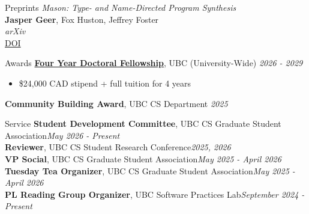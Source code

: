\documentclass{resume} %
\begin{document}
\begin{rSection}{Preprints} 
  {\em Mason: Type- and Name-Directed Program Synthesis}
  \\\textbf{Jasper Geer}, Fox Huston, Jeffrey Foster
  \\ {\it arXiv}
  \\ \href{https://doi.org/10.48550/arXiv.2602.16981}{DOI}
\end{rSection}

\begin{rSection}{Awards} 
{\bf \href{https://www.grad.ubc.ca/awards/four-year-doctoral-fellowship-4yf}{Four Year Doctoral Fellowship}}{, UBC (University-Wide)} \hfill{\em 2026 - 2029}
\begin{itemize}
  \item \$24,000 CAD stipend + full tuition for 4 years
\end{itemize}

{\bf Community Building Award}{, UBC CS Department} \hfill{\em 2025}


\end{rSection}

\begin{rSection}{Service} 
{\bf Student Development Committee}{, UBC CS Graduate Student Association}\hfill{\em May 2026 - Present}\\
{\bf Reviewer}{, UBC CS Student Research Conference}\hfill{\em 2025, 2026}\\
{\bf VP Social}{, UBC CS Graduate Student Association}\hfill{\em May 2025 - April 2026}\\
{\bf Tuesday Tea Organizer}{, UBC CS Graduate Student Association}\hfill{\em May 2025 - April 2026}\\
{\bf PL Reading Group Organizer}{, UBC Software Practices Lab}\hfill{\em September 2024 - Present}

\end{rSection}

\newpage
\end{document}
